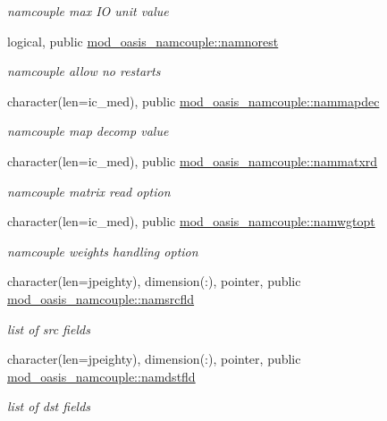 \begin{DoxyCompactItemize}
\begin{DoxyCompactList}\small\item\em namcouple max IO unit value \end{DoxyCompactList}\item 
logical, public \hyperlink{namespacemod__oasis__namcouple_ad1bd3ea485ad5f5114eb4b7f8c831ccb}{mod\+\_\+oasis\+\_\+namcouple\+::namnorest}
\begin{DoxyCompactList}\small\item\em namcouple allow no restarts \end{DoxyCompactList}\item 
character(len=ic\+\_\+med), public \hyperlink{namespacemod__oasis__namcouple_a484aaf8a6d7eaa0675a8249fa94509cf}{mod\+\_\+oasis\+\_\+namcouple\+::nammapdec}
\begin{DoxyCompactList}\small\item\em namcouple map decomp value \end{DoxyCompactList}\item 
character(len=ic\+\_\+med), public \hyperlink{namespacemod__oasis__namcouple_ad9ac6585de157a05d793636addf672a5}{mod\+\_\+oasis\+\_\+namcouple\+::nammatxrd}
\begin{DoxyCompactList}\small\item\em namcouple matrix read option \end{DoxyCompactList}\item 
character(len=ic\+\_\+med), public \hyperlink{namespacemod__oasis__namcouple_a03a63fe10e98e695e556ee190cd3accc}{mod\+\_\+oasis\+\_\+namcouple\+::namwgtopt}
\begin{DoxyCompactList}\small\item\em namcouple weights handling option \end{DoxyCompactList}\item 
character(len=jpeighty), dimension(\+:), pointer, public \hyperlink{namespacemod__oasis__namcouple_a5fcb5a4f2a49f414fafe38b03c5c089d}{mod\+\_\+oasis\+\_\+namcouple\+::namsrcfld}
\begin{DoxyCompactList}\small\item\em list of src fields \end{DoxyCompactList}\item 
character(len=jpeighty), dimension(\+:), pointer, public \hyperlink{namespacemod__oasis__namcouple_ac4cfec209e4169b6098f9a8b9be1ffb1}{mod\+\_\+oasis\+\_\+namcouple\+::namdstfld}
\begin{DoxyCompactList}\small\item\em list of dst fields \end{DoxyCompactList}\item 

\end{DoxyCompactItemize}
